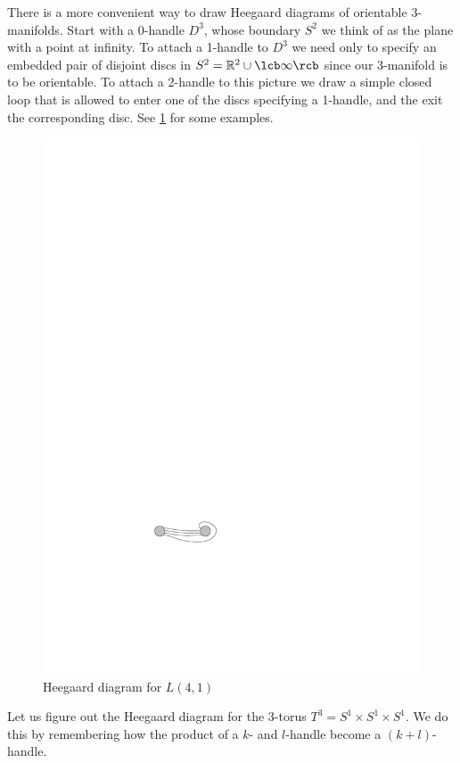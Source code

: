 There is a more convenient way to draw Heegaard diagrams of orientable 3-manifolds. Start with a 0-handle $D^3$, whose boundary $S^2$ we think of as the plane with a point at infinity. To attach a 1-handle to $D^3$ we need only to specify an embedded pair of disjoint discs in $S^2 = \mathbb R^2 \cup \lcb \infty \rcb$ since our 3-manifold is to be orientable. To attach a 2-handle to this picture we draw a simple closed loop that is allowed to enter one of the discs specifying a 1-handle, and the exit the corresponding disc. See \cref{hd-examples} for some examples.

\begin{figure}[tb]
\centering
\includegraphics[scale=1.5]{graphics/hd-examples}
\caption{Heegaard diagram for $L(4,1)$}
\label{hd-examples}
\end{figure}

\begin{example}
Let us figure out the Heegaard diagram for the 3-torus $T^3 = S^1 \times S^1 \times S^1$. We do this by remembering how the product of a $k$- and $l$-handle become a $(k+l)$-handle. 
\end{example}







